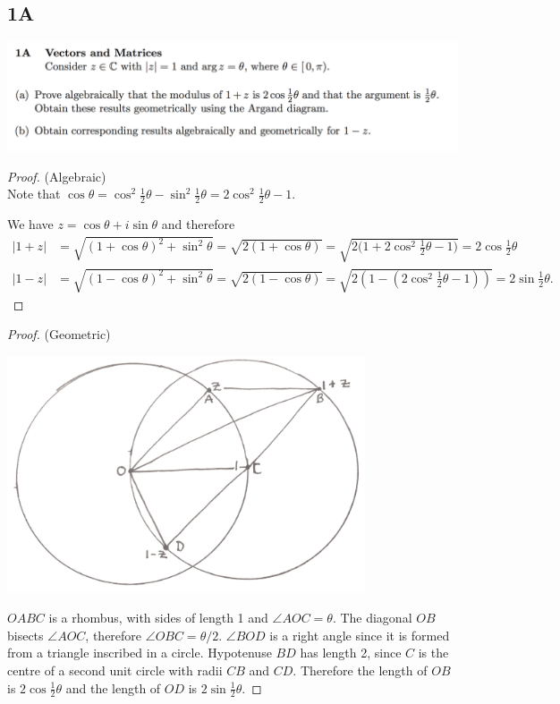 \documentclass[12pt]{article}
\begin{document}
\subsection*{1A}
\begin{mdframed}
\includegraphics[width=400pt]{img/misc--cambridge-1a-2017-1-1A.png}
\end{mdframed}
\begin{proof}(Algebraic)\\
Note that
$\cos\theta = \cos^2\frac{1}{2}\theta - \sin^2\frac{1}{2}\theta = 2\cos^2\frac{1}{2}\theta - 1$.

We have $z = \cos\theta + i\sin\theta$ and therefore
\begin{align*}
  |1 + z|  &= \sqrt{(1 + \cos\theta)^2 + \sin^2\theta}
             = \sqrt{2(1 + \cos\theta)}
             = \sqrt{2\Big(1 + 2\cos^2\frac{1}{2}\theta - 1\Big)}
             = 2\cos\frac{1}{2}\theta\\
  |1 - z| &= \sqrt{(1 - \cos\theta)^2 + \sin^2\theta}
            = \sqrt{2(1 - \cos\theta)}
            = \sqrt{2(1 - (2\cos^2\frac{1}{2}\theta - 1))}
            = 2\sin\frac{1}{2}\theta.
\end{align*}
\end{proof}

\begin{proof}(Geometric)\\
  \begin{mdframed}
    \includegraphics[width=300pt]{img/misc--cambridge-1a-2017-1-1A-diagram.png}
  \end{mdframed}
  $OABC$ is a rhombus, with sides of length 1 and $\angle AOC=\theta$. The diagonal $OB$ bisects
  $\angle AOC$, therefore $\angle OBC = \theta/2$. $\angle BOD$ is a right angle since it is formed
  from a triangle inscribed in a circle. Hypotenuse $BD$ has length 2, since $C$ is the centre of a
  second unit circle with radii $CB$ and $CD$. Therefore the length of $OB$ is
  $2\cos\frac{1}{2}\theta$ and the length of $OD$ is $2\sin\frac{1}{2}\theta$.
\end{proof}
\end{document}
